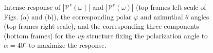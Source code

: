 \documentclass[prb,11pt,tightenlines,twocolumn,aps]{revtex4-1}
\begin{document}
\begin{figure}[t]
    \centering
    \\
    
    \caption{Intense response of
    $|\mathcal{V}^{\mathrm{x}}(\omega)|$ and
    $|\mathcal{V}^{\mathrm{y}}(\omega)|$ (top frames left scale of Figs. (a) and
    (b)), the corresponding polar $\varphi$ and azimuthal $\theta$ angles (top
    frames right scale), and the corresponding three components (bottom frames)
    for the \emph{up} structure fixing the polarization angle to
    $\alpha=40^{\circ}$ to maximize the response.}

    \label{fig:up-vab-comp-rtp-2}
\end{figure}
\end{document}
